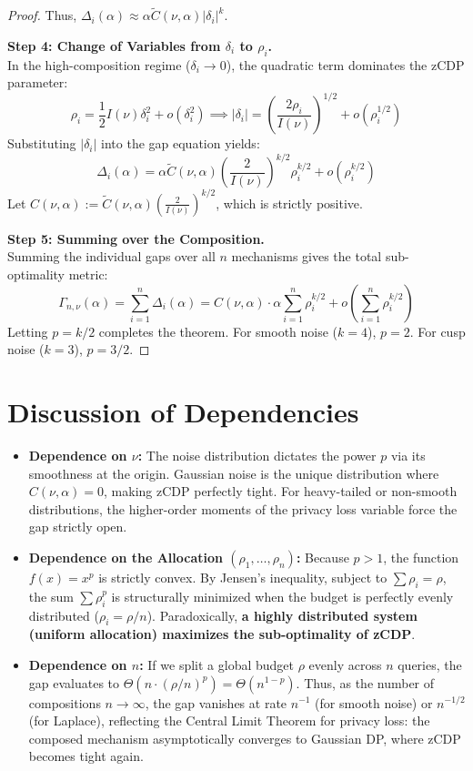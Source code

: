 \documentclass[11pt]{article}
\theoremstyle{definition}
\begin{document}
\begin{proof}
Thus, $\Delta_i(\alpha) \approx \alpha \tilde{C}(\nu, \alpha) |\delta_i|^k$.

\textbf{Step 4: Change of Variables from $\delta_i$ to $\rho_i$.} \\
In the high-composition regime ($\delta_i \to 0$), the quadratic term dominates the zCDP parameter:
\[
\rho_i = \frac{1}{2} I(\nu) \delta_i^2 + o(\delta_i^2) \implies |\delta_i| = \left( \frac{2 \rho_i}{I(\nu)} \right)^{1/2} + o(\rho_i^{1/2})
\]
Substituting $|\delta_i|$ into the gap equation yields:
\[
\Delta_i(\alpha) = \alpha \tilde{C}(\nu, \alpha) \left( \frac{2}{I(\nu)} \right)^{k/2} \rho_i^{k/2} + o(\rho_i^{k/2})
\]
Let $C(\nu, \alpha) := \tilde{C}(\nu, \alpha) \left( \frac{2}{I(\nu)} \right)^{k/2}$, which is strictly positive.

\textbf{Step 5: Summing over the Composition.} \\
Summing the individual gaps over all $n$ mechanisms gives the total sub-optimality metric:
\[
\Gamma_{n,\nu}(\alpha) = \sum_{i=1}^n \Delta_i(\alpha) = C(\nu, \alpha) \cdot \alpha \sum_{i=1}^n \rho_i^{k/2} + o\left(\sum_{i=1}^n \rho_i^{k/2}\right)
\]
Letting $p = k/2$ completes the theorem. For smooth noise ($k=4$), $p=2$. For cusp noise ($k=3$), $p=3/2$.
\end{proof}

\section{Discussion of Dependencies}

\begin{itemize}
    \item \textbf{Dependence on $\nu$:} The noise distribution dictates the power $p$ via its smoothness at the origin. Gaussian noise is the unique distribution where $C(\nu, \alpha) = 0$, making zCDP perfectly tight. For heavy-tailed or non-smooth distributions, the higher-order moments of the privacy loss variable force the gap strictly open.
    \item \textbf{Dependence on the Allocation $(\rho_1, \dots, \rho_n)$:} Because $p > 1$, the function $f(x) = x^p$ is strictly convex. By Jensen's inequality, subject to $\sum \rho_i = \rho$, the sum $\sum \rho_i^p$ is structurally minimized when the budget is perfectly evenly distributed ($\rho_i = \rho/n$). Paradoxically, \textbf{a highly distributed system (uniform allocation) maximizes the sub-optimality of zCDP}.
    \item \textbf{Dependence on $n$:} If we split a global budget $\rho$ evenly across $n$ queries, the gap evaluates to $\Theta(n \cdot (\rho/n)^p) = \Theta(n^{1-p})$. Thus, as the number of compositions $n \to \infty$, the gap vanishes at rate $n^{-1}$ (for smooth noise) or $n^{-1/2}$ (for Laplace), reflecting the Central Limit Theorem for privacy loss: the composed mechanism asymptotically converges to Gaussian DP, where zCDP becomes tight again.
\end{itemize}
\end{document}
